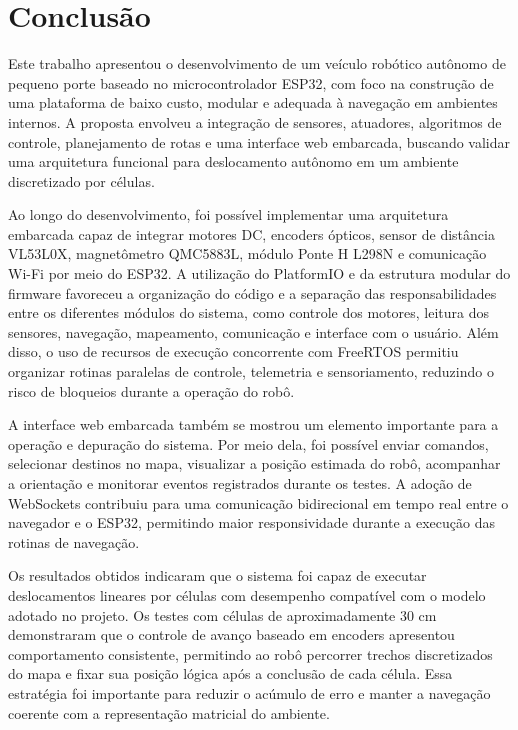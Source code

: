 \documentclass[	12pt, Times, openright, twoside, a4paper, english, brazil]{abntex2}
\begin{document}

\chapter{Conclusão}

Este trabalho apresentou o desenvolvimento de um veículo robótico autônomo de pequeno porte baseado no microcontrolador ESP32, com foco na construção de uma plataforma de baixo custo, modular e adequada à navegação em ambientes internos. A proposta envolveu a integração de sensores, atuadores, algoritmos de controle, planejamento de rotas e uma interface web embarcada, buscando validar uma arquitetura funcional para deslocamento autônomo em um ambiente discretizado por células.

Ao longo do desenvolvimento, foi possível implementar uma arquitetura embarcada capaz de integrar motores DC, encoders ópticos, sensor de distância VL53L0X, magnetômetro QMC5883L, módulo Ponte H L298N e comunicação Wi-Fi por meio do ESP32. A utilização do PlatformIO e da estrutura modular do firmware favoreceu a organização do código e a separação das responsabilidades entre os diferentes módulos do sistema, como controle dos motores, leitura dos sensores, navegação, mapeamento, comunicação e interface com o usuário. Além disso, o uso de recursos de execução concorrente com FreeRTOS permitiu organizar rotinas paralelas de controle, telemetria e sensoriamento, reduzindo o risco de bloqueios durante a operação do robô.

A interface web embarcada também se mostrou um elemento importante para a operação e depuração do sistema. Por meio dela, foi possível enviar comandos, selecionar destinos no mapa, visualizar a posição estimada do robô, acompanhar a orientação e monitorar eventos registrados durante os testes. A adoção de WebSockets contribuiu para uma comunicação bidirecional em tempo real entre o navegador e o ESP32, permitindo maior responsividade durante a execução das rotinas de navegação.

Os resultados obtidos indicaram que o sistema foi capaz de executar deslocamentos lineares por células com desempenho compatível com o modelo adotado no projeto. Os testes com células de aproximadamente 30 cm demonstraram que o controle de avanço baseado em encoders apresentou comportamento consistente, permitindo ao robô percorrer trechos discretizados do mapa e fixar sua posição lógica após a conclusão de cada célula. Essa estratégia foi importante para reduzir o acúmulo de erro e manter a navegação coerente com a representação matricial do ambiente.
\end{document}
